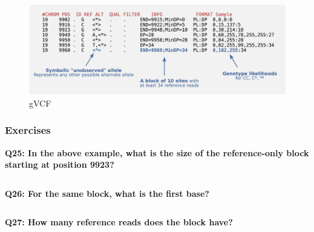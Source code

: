 \documentclass[11pt]{article}
\makeatletter
\newcommand{\boxspacing}{\kern\kvtcb@left@rule\kern\kvtcb@boxsep}
\newcommand{\prompt}[4]{
        {\ttfamily\llap{{\color{blue}\LARGE\faKeyboardO\hspace{3pt}#4}}\vspace{-\baselineskip}}
    }
\makeatother
\begin{document}
    \begin{figure}[!h]
\centering
\includegraphics{img/gVCF.png}
\caption{gVCF}
\end{figure}

    \hypertarget{exercises}{%
\subsubsection{Exercises}\label{exercises}}

\textbf{Q25: In the above example, what is the size of the
reference-only block starting at position 9923?}

    \begin{tcolorbox}[breakable, size=fbox, boxrule=1pt, pad at break*=1mm,colback=cellbackground, colframe=cellborder]
\prompt{In}{incolor}{ }{\boxspacing}
\begin{Verbatim}[commandchars=\\\{\}]

\end{Verbatim}
\end{tcolorbox}

    \textbf{Q26: For the same block, what is the first base?}

    \begin{tcolorbox}[breakable, size=fbox, boxrule=1pt, pad at break*=1mm,colback=cellbackground, colframe=cellborder]
\prompt{In}{incolor}{ }{\boxspacing}
\begin{Verbatim}[commandchars=\\\{\}]

\end{Verbatim}
\end{tcolorbox}

    \textbf{Q27: How many reference reads does the block have?}

    \begin{tcolorbox}[breakable, size=fbox, boxrule=1pt, pad at break*=1mm,colback=cellbackground, colframe=cellborder]
\prompt{In}{incolor}{ }{\boxspacing}
\begin{Verbatim}[commandchars=\\\{\}]

\end{Verbatim}
\end{tcolorbox}
\end{document}
